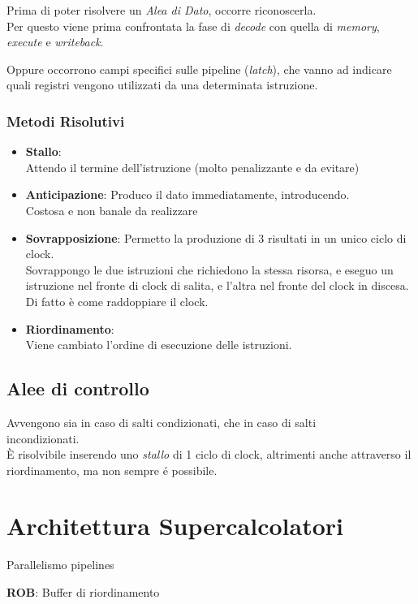 \documentclass[a4paper,10pt]{article}
\begin{document}
Prima di poter risolvere un \textit{Alea di Dato}, occorre riconoscerla.
\\
Per questo viene prima confrontata la fase di \textit{decode} con quella di \textit{memory}, \textit{execute} e \textit{writeback}.

Oppure occorrono campi specifici sulle pipeline (\textit{latch}), che vanno ad indicare quali registri vengono utilizzati da una determinata istruzione.

\subsubsection{Metodi Risolutivi}
\begin{itemize}
    \item \textbf{Stallo}:
        \\
        Attendo il termine dell'istruzione (molto penalizzante e da evitare)
    \item \textbf{Anticipazione}:
        Produco il dato immediatamente, introducendo.
        \\
        Costosa e non banale da realizzare
    \item \textbf{Sovrapposizione}:
        Permetto la produzione di 3 risultati in un unico ciclo di clock.
        \\
        Sovrappongo le due istruzioni che richiedono la stessa risorsa, e eseguo un istruzione nel fronte di clock di salita,
        e l'altra nel fronte del clock in discesa.
        \\
        Di fatto è come raddoppiare il clock.

    \item \textbf{Riordinamento}:
        \\
        Viene cambiato l'ordine di esecuzione delle istruzioni.

\end{itemize}

\subsection{Alee di controllo}
Avvengono sia in caso di salti condizionati, che in caso di salti\\ incondizionati.
\\
È risolvibile inserendo uno \textit{stallo} di 1 ciclo di clock, altrimenti anche attraverso il riordinamento, ma non sempre é possibile.


\section{Architettura Supercalcolatori}
Parallelismo pipelines

\textbf{ROB}: Buffer di riordinamento







\newpage
\tableofcontents{}
\end{document}
